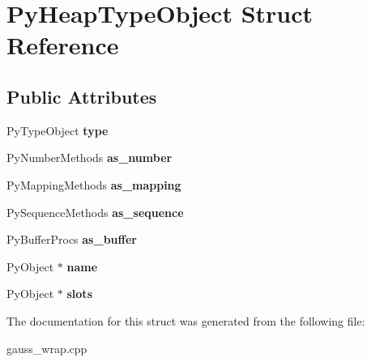 \hypertarget{struct_py_heap_type_object}{\section{Py\-Heap\-Type\-Object Struct Reference}
\label{struct_py_heap_type_object}
}
\subsection*{Public Attributes}
\begin{DoxyCompactItemize}
\item 
\hypertarget{struct_py_heap_type_object_a8b961137de4ebeed5a5d2e4b47ee1ca7}{Py\-Type\-Object {\bfseries type}}\label{struct_py_heap_type_object_a8b961137de4ebeed5a5d2e4b47ee1ca7}

\item 
\hypertarget{struct_py_heap_type_object_a795de378df40d11321c0dbe463759560}{Py\-Number\-Methods {\bfseries as\-\_\-number}}\label{struct_py_heap_type_object_a795de378df40d11321c0dbe463759560}

\item 
\hypertarget{struct_py_heap_type_object_a3112d193aea288a92036360bec1ce0a5}{Py\-Mapping\-Methods {\bfseries as\-\_\-mapping}}\label{struct_py_heap_type_object_a3112d193aea288a92036360bec1ce0a5}

\item 
\hypertarget{struct_py_heap_type_object_ad553caad5da3a7004aae1b7ac0289f12}{Py\-Sequence\-Methods {\bfseries as\-\_\-sequence}}\label{struct_py_heap_type_object_ad553caad5da3a7004aae1b7ac0289f12}

\item 
\hypertarget{struct_py_heap_type_object_a026c64b0a5163ea580e79640ecf209de}{Py\-Buffer\-Procs {\bfseries as\-\_\-buffer}}\label{struct_py_heap_type_object_a026c64b0a5163ea580e79640ecf209de}

\item 
\hypertarget{struct_py_heap_type_object_a5440c0413b3c519d996119695c957c80}{Py\-Object $\ast$ {\bfseries name}}\label{struct_py_heap_type_object_a5440c0413b3c519d996119695c957c80}

\item 
\hypertarget{struct_py_heap_type_object_a15212a8f85d939b3f4b133ecda1b62e5}{Py\-Object $\ast$ {\bfseries slots}}\label{struct_py_heap_type_object_a15212a8f85d939b3f4b133ecda1b62e5}

\end{DoxyCompactItemize}


The documentation for this struct was generated from the following file\-:\begin{DoxyCompactItemize}
\item 
gauss\-\_\-wrap.\-cpp\end{DoxyCompactItemize}
